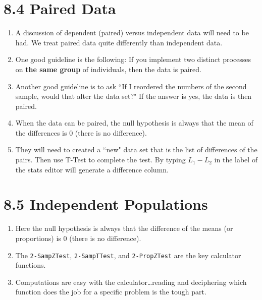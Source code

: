 \documentclass{article}
\begin{document}
\section*{8.4 Paired Data}

\begin{enumerate}

    \item A discussion of dependent (paired) versus independent data will need to be had.  We treat paired data quite differently than independent data.
    
    \item One good guideline is the following: If you implement two distinct processes on \textbf{the same group} of individuals, then the data is paired.
    
    \item Another good guideline is to ask ``If I reordered the numbers of the second sample, would that alter the data set?" If the answer is yes, the data is then paired.
    
    \item When the data can be paired, the null hypothesis is always that the mean of the differences is 0 (there is no difference).
    
    \item They will need to created a ``new" data set that is the list of differences of the pairs. Then use T-Test to complete the test. By typing $L_1 - L_2$ in the label of the stats editor will generate a difference column.
    
\end{enumerate}

\section*{8.5 Independent Populations}

\begin{enumerate}

    \item Here the null hypothesis is always that the difference of the means (or proportions) is 0 (there is no difference).
    
    \item The \texttt{2-SampZTest}, \texttt{2-SampTTest}, and \texttt{2-PropZTest} are the key calculator functions.
    
    \item Computations are easy with the calculator\ldots reading and deciphering which function does the job for a specific problem is the tough part.
    
\end{enumerate}
\end{document}
